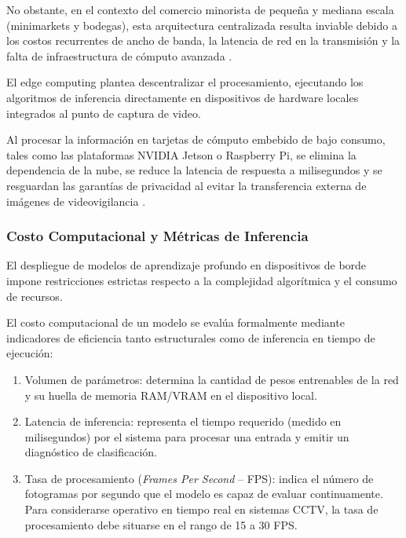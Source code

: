 No obstante, en el contexto del comercio minorista de pequeña y mediana escala (minimarkets y bodegas), esta arquitectura centralizada resulta inviable debido a los costos recurrentes de ancho de banda, la latencia de red en la transmisión y la falta de infraestructura de cómputo avanzada \cite{aguero_intelligent_2025}.

El edge computing plantea descentralizar el procesamiento, ejecutando los algoritmos de inferencia directamente en dispositivos de hardware locales integrados al punto de captura de video.

Al procesar la información en tarjetas de cómputo embebido de bajo consumo, tales como las plataformas NVIDIA Jetson o Raspberry Pi, se elimina la dependencia de la nube, se reduce la latencia de respuesta a milisegundos y se resguardan las garantías de privacidad al evitar la transferencia externa de imágenes de videovigilancia \cite{hameed_real_2025, pranav_deep_2023}.


\subsubsection{Costo Computacional y Métricas de Inferencia}

El despliegue de modelos de aprendizaje profundo en dispositivos de borde impone restricciones estrictas respecto a la complejidad algorítmica y el consumo de recursos.

El costo computacional de un modelo se evalúa formalmente mediante indicadores de eficiencia tanto estructurales como de inferencia en tiempo de ejecución:

\begin{enumerate}
    \item Volumen de parámetros: determina la cantidad de pesos entrenables de la red y su huella de memoria RAM/VRAM en el dispositivo local.

    \item Latencia de inferencia: representa el tiempo requerido (medido en milisegundos) por el sistema para procesar una entrada y emitir un diagnóstico de clasificación.

    \item Tasa de procesamiento (\textit{Frames Per Second} -- FPS): indica el número de fotogramas por segundo que el modelo es capaz de evaluar continuamente. Para considerarse operativo en tiempo real en sistemas CCTV, la tasa de procesamiento debe situarse en el rango de 15 a 30 FPS.
\end{enumerate}

